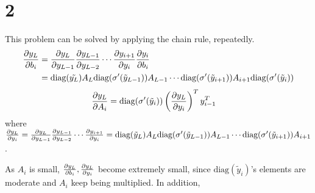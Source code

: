 \documentclass[10pt]{article}
\begin{document}
\section*{2}
This problem can be solved by applying the chain rule, repeatedly.
\begin{align}
    {\partial y_L \over \partial b_i} &= {\partial y_L \over \partial y_{L-1}} {\partial y_{L-1}\over \partial y_{L-2}}\cdots {\partial y_{i+1}\over \partial y_{i}}{\partial y_i \over \partial b_i} \\
    &= \text{diag}(\tilde{y_L})A_L \text{diag}(\sigma^\prime(\tilde{y}_{L-1}))A_{L-1}\cdots\text{diag}(\sigma^\prime(\tilde{y}_{i+1}))A_{i+1}\text{diag}(\sigma^\prime(\tilde{y}_i))
\end{align} 
\begin{align}
    {\partial y_L \over \partial A_i} &= \text{diag}(\sigma^\prime(\tilde{y}_i))\left({\partial y_L \over \partial y_i}\right)^Ty_{i-1}^T
\end{align}
where ${\partial y_L \over \partial y_i} = {\partial y_L \over \partial y_{L-1}} {\partial y_{L-1} \over \partial y_{L-2}} \cdots {\partial y_{i+1} \over \partial y_i} = \text{diag}(\tilde{y}_L)A_L\text{diag}(\sigma^\prime(\tilde{y}_{L-1}))A_{L-1} \cdots \text{diag}(\sigma^\prime(\tilde{y}_{i+1}))A_{i+1}$.

As $A_i$ is small, ${\partial y_L \over \partial b_i}, {\partial y_L \over \partial y_i}$ become extremely small, since $\text{diag}(\tilde{y}_i)$'s elements are moderate and $A_i$ keep being multiplied.
In addition, 
\end{document}
